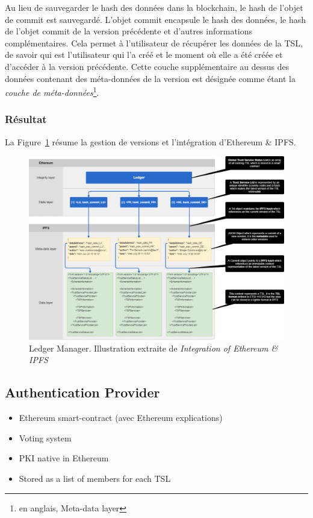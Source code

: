 \documentclass{tnreport}
\begin{document}
Au lieu de sauvegarder le hash des données dans la blockchain, le hash de l'objet de commit est sauvegardé. L'objet commit encapsule le hash des données, le hash de l'objet commit de la version précédente et d'autres informations complémentaires. 
Cela permet à l'utilisateur de récupérer les données de la TSL, de savoir qui est l'utilisateur qui l'a créé et le moment où elle a été créée et d'accéder à la version précédente. 
Cette couche supplémentaire au dessus des données contenant des méta-données de la version est désignée comme étant la {\em couche de méta-données}\footnote{en anglais, Meta-data layer}.

\subsubsection{Résultat}

La Figure~\ref{fig:versioning} résume la gestion de versions et l'intégration d'Ethereum \& IPFS.

\clearpage

\begin{figure}[h]
	\centering
	\includegraphics[scale=0.35]{figures/versioning}
	\caption{Ledger Manager. Illustration extraite de \textit{Integration of Ethereum \& IPFS}~\cite{ipfs-ethereum}}
	\label{fig:versioning}
\end{figure}

\subsection{Authentication Provider}
\label{sec:authentication}

\iffalse
\begin{itemize}
	\item Ethereum smart-contract (avec Ethereum explications)
	\item Voting system
	\item PKI native in Ethereum
	\item Stored as a list of members for each TSL
\end{itemize}
\end{document}
